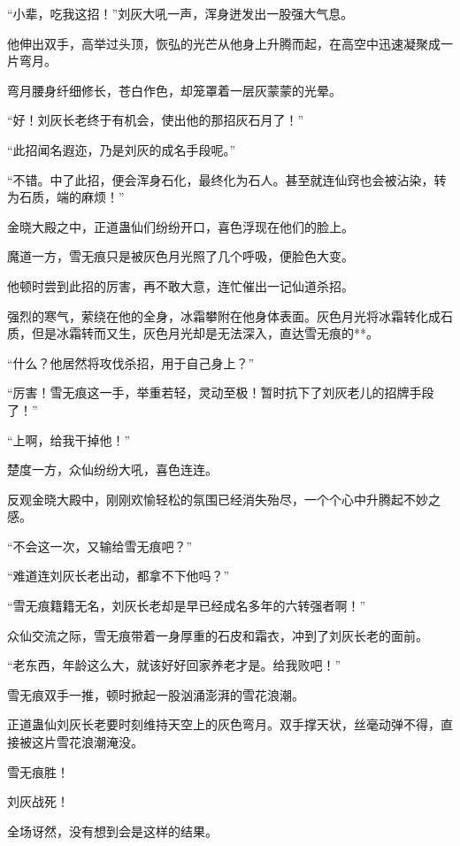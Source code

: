 
\begin{this_body}

“小辈，吃我这招！”刘灰大吼一声，浑身迸发出一股强大气息。

他伸出双手，高举过头顶，恢弘的光芒从他身上升腾而起，在高空中迅速凝聚成一片弯月。

弯月腰身纤细修长，苍白作色，却笼罩着一层灰蒙蒙的光晕。

“好！刘灰长老终于有机会，使出他的那招灰石月了！”

“此招闻名遐迩，乃是刘灰的成名手段呢。”

“不错。中了此招，便会浑身石化，最终化为石人。甚至就连仙窍也会被沾染，转为石质，端的麻烦！”

金晓大殿之中，正道蛊仙们纷纷开口，喜色浮现在他们的脸上。

魔道一方，雪无痕只是被灰色月光照了几个呼吸，便脸色大变。

他顿时尝到此招的厉害，再不敢大意，连忙催出一记仙道杀招。

强烈的寒气，萦绕在他的全身，冰霜攀附在他身体表面。灰色月光将冰霜转化成石质，但是冰霜转而又生，灰色月光却是无法深入，直达雪无痕的**。

“什么？他居然将攻伐杀招，用于自己身上？”

“厉害！雪无痕这一手，举重若轻，灵动至极！暂时抗下了刘灰老儿的招牌手段了！”

“上啊，给我干掉他！”

楚度一方，众仙纷纷大吼，喜色连连。

反观金晓大殿中，刚刚欢愉轻松的氛围已经消失殆尽，一个个心中升腾起不妙之感。

“不会这一次，又输给雪无痕吧？”

“难道连刘灰长老出动，都拿不下他吗？”

“雪无痕籍籍无名，刘灰长老却是早已经成名多年的六转强者啊！”

众仙交流之际，雪无痕带着一身厚重的石皮和霜衣，冲到了刘灰长老的面前。

“老东西，年龄这么大，就该好好回家养老才是。给我败吧！”

雪无痕双手一推，顿时掀起一股汹涌澎湃的雪花浪潮。

正道蛊仙刘灰长老要时刻维持天空上的灰色弯月。双手撑天状，丝毫动弹不得，直接被这片雪花浪潮淹没。

雪无痕胜！

刘灰战死！

全场讶然，没有想到会是这样的结果。


\end{this_body}
